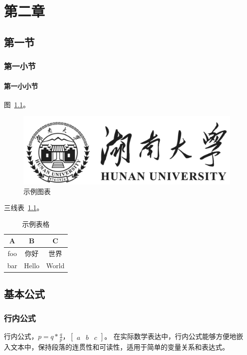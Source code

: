 \chapter{第二章}

\section{第一节}

\subsection{第一小节}

\subsubsection{第一小小节}

图~\ref{fig:demo}。

\begin{figure}[H]
    \centering
    \includegraphics[width=0.3\linewidth]{figures/hnu_logo.png}
    \caption{示例图表}
    \label{fig:demo}
\end{figure}

三线表~\ref{table:demo}。

\begin{table}[H]
    \centering
    \caption{示例表格}
    \label{table:demo}
    \begin{tabular}{ccc}
        \toprule
        A   & B     & C     \\
        \midrule
        foo & 你好  & 世界  \\
        bar & Hello & World \\
        \bottomrule
    \end{tabular}
\end{table}


\section{基本公式}

\subsection{行内公式}
行内公式，$p = q * \frac{q}{p}$，$\begin{bmatrix} a & b & c \end{bmatrix}$。  
在实际数学表达中，行内公式能够方便地嵌入文本中，保持段落的连贯性和可读性，适用于简单的变量关系和表达式。

